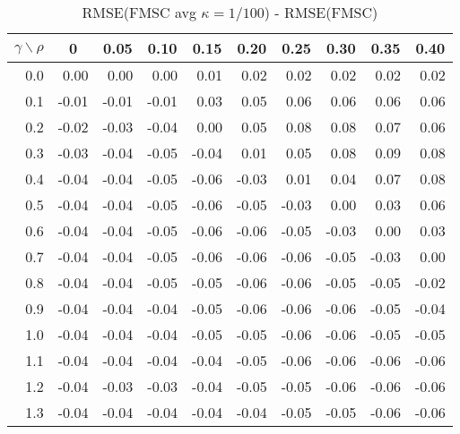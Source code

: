 \documentclass[12pt]{article}
\begin{document}
%
\begin{table}[!tbp]
 \begin{center}
\caption{RMSE(FMSC avg $\kappa = 1/100$) - RMSE(FMSC)}
 \begin{tabular}{r|rrrrrrrrr}\hline\hline
\multicolumn{1}{c|}{$\gamma\backslash\rho$}&\multicolumn{1}{c}{0}&\multicolumn{1}{c}{0.05}&\multicolumn{1}{c}{0.10}&\multicolumn{1}{c}{0.15}&\multicolumn{1}{c}{0.20}&\multicolumn{1}{c}{0.25}&\multicolumn{1}{c}{0.30}&\multicolumn{1}{c}{0.35}&\multicolumn{1}{c}{0.40}\tabularnewline
\hline
0.0& 0.00& 0.00& 0.00& 0.01& 0.02& 0.02& 0.02& 0.02& 0.02\tabularnewline
0.1&-0.01&-0.01&-0.01& 0.03& 0.05& 0.06& 0.06& 0.06& 0.06\tabularnewline
0.2&-0.02&-0.03&-0.04& 0.00& 0.05& 0.08& 0.08& 0.07& 0.06\tabularnewline
0.3&-0.03&-0.04&-0.05&-0.04& 0.01& 0.05& 0.08& 0.09& 0.08\tabularnewline
0.4&-0.04&-0.04&-0.05&-0.06&-0.03& 0.01& 0.04& 0.07& 0.08\tabularnewline
0.5&-0.04&-0.04&-0.05&-0.06&-0.05&-0.03& 0.00& 0.03& 0.06\tabularnewline
0.6&-0.04&-0.04&-0.05&-0.06&-0.06&-0.05&-0.03& 0.00& 0.03\tabularnewline
0.7&-0.04&-0.04&-0.05&-0.06&-0.06&-0.06&-0.05&-0.03& 0.00\tabularnewline
0.8&-0.04&-0.04&-0.05&-0.05&-0.06&-0.06&-0.05&-0.05&-0.02\tabularnewline
0.9&-0.04&-0.04&-0.04&-0.05&-0.06&-0.06&-0.06&-0.05&-0.04\tabularnewline
1.0&-0.04&-0.04&-0.04&-0.05&-0.05&-0.06&-0.06&-0.05&-0.05\tabularnewline
1.1&-0.04&-0.04&-0.04&-0.04&-0.05&-0.06&-0.06&-0.06&-0.06\tabularnewline
1.2&-0.04&-0.03&-0.03&-0.04&-0.05&-0.05&-0.06&-0.06&-0.06\tabularnewline
1.3&-0.04&-0.04&-0.04&-0.04&-0.04&-0.05&-0.05&-0.06&-0.06\tabularnewline
\hline
\end{tabular}

\end{center}

\end{table}
\end{document}
